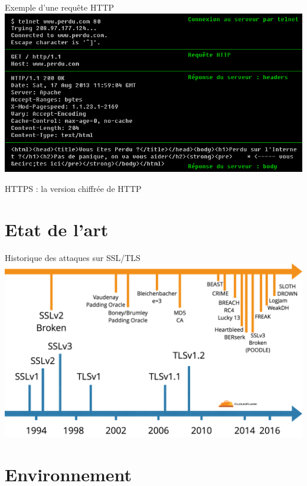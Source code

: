 \documentclass{beamer}
\begin{document}
\begin{frame}{Exemple d'une requête HTTP}
    \includegraphics[scale=0.50]{../medias/perdu.png}
\end{frame}

\begin{frame}{HTTPS : la version chiffrée de HTTP}


\end{frame}

\section{Etat de l'art}

\begin{frame}{Historique des attaques sur SSL/TLS}
    \includegraphics[scale=0.19]{../medias/history-tls-attacks.png}
\end{frame}

\section{Environnement}
\end{document}

